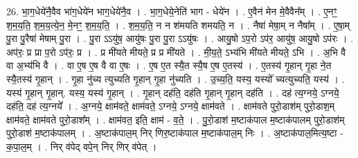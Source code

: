 \documentclass[17pt]{extarticle}
\begin{document}
26. भा॒ग॒धेये॑नै॒वैव भा॑ग॒धेये॑न भाग॒धेये॑नै॒व । . भा॒ग॒धेये॒नेति॑ भाग - धेये॑न । . ए॒वैन॑ मेन मे॒वैवैन᳚म् । . ए॒नꣳ॒॒ श॒म॒य॒ति॒ श॒म॒य॒त्ये॒न॒ मे॒नꣳ॒॒ श॒म॒य॒ति॒ । . श॒म॒य॒ति॒ न न श॑मयति शमयति॒ न । . नैषा॑ मेषा॒म् न नैषा᳚म् । . ए॒षा॒म् पु॒रा पु॒रैषा॑ मेषाम् पु॒रा । . पु॒रा ऽऽयु॑ष॒ आयु॑षः पु॒रा पु॒रा ऽऽयु॑षः । . आयु॒षो ऽप॒रो ऽप॑र॒ आयु॑ष॒ आयु॒षो ऽप॑रः । . अप॑रः॒ प्र प्रा प॒रो ऽप॑रः॒ प्र । . प्र मी॑यते मीयते॒ प्र प्र मी॑यते । . मी॒य॒ते॒ ऽभ्य॑भि मी॑यते मीयते॒ ऽभि । . अ॒भि वै वा अ॒भ्य॑भि वै । . वा ए॒ष ए॒ष वै वा ए॒षः । . ए॒ष ए॒त स्यै॒त स्यै॒ष ए॒ष ए॒तस्य॑ । . ए॒तस्य॑ गृ॒हान् गृ॒हा ने॒त स्यै॒तस्य॑ गृ॒हान् । . गृ॒हा नु॑च्य त्युच्यति गृ॒हान् गृ॒हा नु॑च्यति । . उ॒च्य॒ति॒ यस्य॒ यस्यो᳚ च्यत्युच्यति॒ यस्य॑ । . यस्य॑ गृ॒हान् गृ॒हान्. यस्य॒ यस्य॑ गृ॒हान् । . गृ॒हान् दह॑ति॒ दह॑ति गृ॒हान् गृ॒हान् दह॑ति । . दह॑ त्य॒ग्नये॒ ऽग्नये॒ दह॑ति॒ दह॑ त्य॒ग्नये᳚ । . अ॒ग्नये॒ क्षाम॑वते॒ क्षाम॑वते॒ ऽग्नये॒ ऽग्नये॒ क्षाम॑वते । . क्षाम॑वते पुरो॒डाश॑म् पुरो॒डाश॒म् क्षाम॑वते॒ क्षाम॑वते पुरो॒डाश᳚म् । . क्षाम॑वत॒ इति॒ क्षाम॑ - व॒ते॒ । . पु॒रो॒डाश॑ म॒ष्टाक॑पाल म॒ष्टाक॑पालम् पुरो॒डाश॑म् पुरो॒डाश॑ म॒ष्टाक॑पालम् । . अ॒ष्टाक॑पाल॒म् निर् णिर॒ष्टाक॑पाल म॒ष्टाक॑पाल॒म् निः । . अ॒ष्टाक॑पाल॒मित्य॒ष्टा - क॒पा॒ल॒म् । . निर् व॑पेद् वपे॒न् निर् णिर् व॑पेत् । \newline
\end{document}
